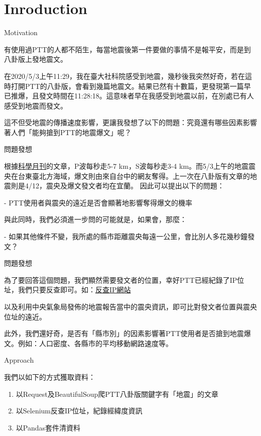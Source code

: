 \section{Inroduction}

\begin{frame}[fragile]{Motivation}

有使用過PTT的人都不陌生，每當地震後第一件要做的事情不是報平安，而是到八卦版上發地震文。

在2020/5/3上午11:29，我在臺大社科院感受到地震，幾秒後我突然好奇，若在這時打開PTT的八卦版，會看到幾篇地震文。結果已然有十數篇，更發現第一篇早已推爆，且發文時間在11:28:18。這意味者早在我感受到地震以前，在別處已有人感受到地震而發文。

這不但受地震的傳播速度影響，更讓我發想了以下的問題：究竟還有哪些因素影響著人們「能夠搶到PTT的地震爆文」呢？

\end{frame}

\begin{frame}[fragile]{問題發想}

根據{\color{blue}\href{http://scimonth.blogspot.com/2009/09/blog-post_1815.html}{科學月刊}}的文章，P波每秒走5-7 km，S波每秒走3-4 km。而5/3上午的地震震央在台東臺北方海域，爆文則由來自台中的網友奪得。上一次在八卦版有文章的地震則是4/12，震央及爆文發文者均在宜蘭。
因此可以提出以下的問題：

- PTT使用者與震央的遠近是否會顯著地影響奪得爆文的機率

與此同時，我們必須進一步問的可能就是，如果會，那麼：

- 如果其他條件不變，我所處的縣市距離震央每遠一公里，會比別人多花幾秒鐘發文？

\end{frame}

\begin{frame}[fragile]{問題發想}

為了要回答這個問題，我們顯然需要發文者的位置，幸好PTT已經紀錄了IP位址，我們只要反查即可。如：{\color{blue}\href{https://www.ez2o.com/App/Net/IP}{反查IP網站}}

以及利用中央氣象局發佈的地震報告當中的震央資訊，即可比對發文者位置與震央位址的遠近。

此外，我們還好奇，是否有「縣市別」的因素影響著PTT使用者是否搶到地震爆文。例如：人口密度、各縣市的平均移動網路速度等。

\end{frame}


\begin{frame}[fragile]{Approach}

我們以如下的方式獲取資料：

\begin{enumerate}
	\item 以Request及BeautifulSoup爬PTT八卦版關鍵字有「地震」的文章
	\item 以Selenium反查IP位址，紀錄經緯度資訊
	\item 以Pandas套件清資料
\end{enumerate}

\end{frame}

